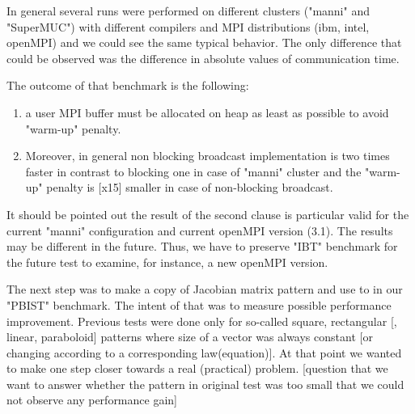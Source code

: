 In general several runs were performed on different clusters ("manni" and "SuperMUC") with different compilers and MPI distributions (ibm, intel, openMPI) and we could see the same typical behavior. The only difference that could be observed was the difference in absolute values of communication time.


The outcome of that benchmark is the following: 
\begin{enumerate}
	\item a user MPI buffer must be allocated on heap as least as possible to avoid "warm-up" penalty.
	\item  Moreover, in general non blocking broadcast implementation is two times faster in contrast to blocking one in case of "manni" cluster and the "warm-up" penalty is [x15] smaller in case of non-blocking broadcast.
\end{enumerate}
 

It should be pointed out the result of the second clause is particular valid for the current "manni" configuration and current openMPI version (3.1). The results may be different in the future. Thus, we have to preserve "IBT" benchmark for the future test to examine, for instance, a new openMPI version. 


The next step was to make a copy of Jacobian matrix pattern and use to in our "PBIST" benchmark. The intent of that was to measure possible performance improvement. Previous tests were done only for so-called square, rectangular [, linear, paraboloid] patterns where size of a vector was always constant [or changing according to a corresponding law(equation)]. At that point we wanted to make one step closer towards a real (practical) problem. [question that we want to answer whether the pattern in original test was too small that we could not observe any performance gain]



